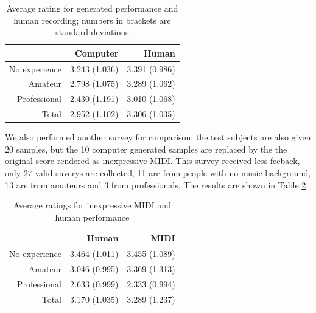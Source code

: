 \begin{table}
   \centering
   \caption{Average rating for generated performance and human recording; numbers in brackets are standard deviations} 
   \label{tab:avg_rating}
   \begin{tabular}{r|rr}
      \hline
      &Computer &Human \\
      \hline
      No experience&3.243 (1.036)&3.391 (0.986)\\
      Amateur&2.798 (1.075)&3.289 (1.062)\\
      Professional&2.430 (1.191)&3.010 (1.068)\\
      \hline
      Total&2.952 (1.102)&3.306 (1.035)\\
      \hline
   \end{tabular}
\end{table}

We also performed another survey for comparison: the test subjects are also given 20 samples, but the 10 computer generated samples are replaced by the the original score rendered as inexpressive MIDI. This survey received less feeback, only 27 valid suverys are collected, 11 are from people with no music background, 13 are from amateurs and 3 from professionals. The results are shown in Table \ref{tab:ctrl_avg}.

\begin{table}
   \centering
   \caption{Average ratings for inexpressive MIDI and human performance}
   \label{tab:ctrl_avg}
   \begin{tabular}{r|rr}
      \hline
      &Human& MIDI \\
      \hline
      No experience&3.464 (1.011)&3.455 (1.089)\\
      Amateur&3.046 (0.995)&3.369 (1.313)\\
      Professional&2.633 (0.999)&2.333 (0.994)\\
      \hline
      Total&3.170 (1.035)&3.289 (1.237)\\
\hline
   \end{tabular}
\end{table}

